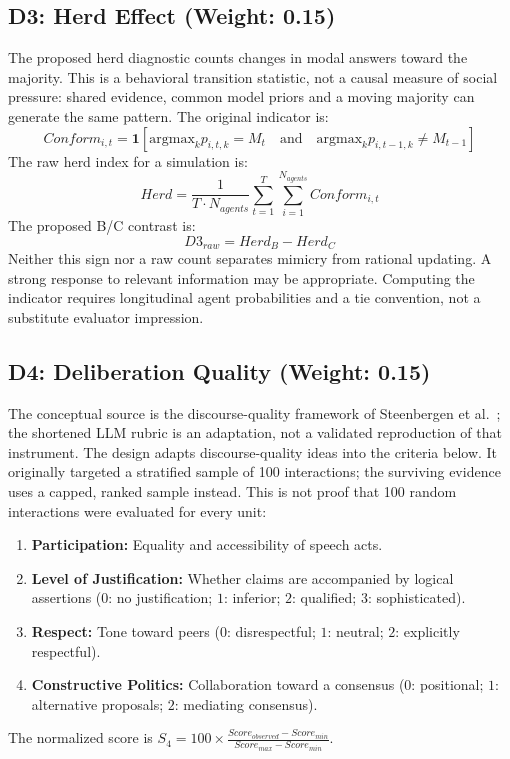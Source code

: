 \subsection{D3: Herd Effect (Weight: 0.15)}
The proposed herd diagnostic counts changes in modal answers toward the majority. This is a behavioral transition statistic, not a causal measure of social pressure: shared evidence, common model priors and a moving majority can generate the same pattern. The original indicator is:
\begin{equation}
    Conform_{i,t} = \mathbf{1}\left[\text{argmax}_k p_{i,t,k} = M_t \quad \text{and} \quad \text{argmax}_k p_{i,t-1,k} \neq M_{t-1}\right]
\end{equation}
The raw herd index for a simulation is:
\begin{equation}
    Herd = \frac{1}{T \cdot N_{agents}} \sum_{t=1}^T \sum_{i=1}^{N_{agents}} Conform_{i,t}
\end{equation}
The proposed B/C contrast is:
\begin{equation}
    D3_{raw} = Herd_B - Herd_C
\end{equation}
Neither this sign nor a raw count separates mimicry from rational updating. A strong response to relevant information may be appropriate. Computing the indicator requires longitudinal agent probabilities and a tie convention, not a substitute evaluator impression.

\subsection{D4: Deliberation Quality (Weight: 0.15)}
The conceptual source is the discourse-quality framework of Steenbergen et al.~\cite{steenbergen2003}; the shortened LLM rubric is an adaptation, not a validated reproduction of that instrument.
The design adapts discourse-quality ideas into the criteria below. It originally targeted a stratified sample of 100 interactions; the surviving evidence uses a capped, ranked sample instead. This is not proof that 100 random interactions were evaluated for every unit:
\begin{enumerate}
    \item \textbf{Participation:} Equality and accessibility of speech acts.
    \item \textbf{Level of Justification:} Whether claims are accompanied by logical assertions ($0$: no justification; $1$: inferior; $2$: qualified; $3$: sophisticated).
    \item \textbf{Respect:} Tone toward peers ($0$: disrespectful; $1$: neutral; $2$: explicitly respectful).
    \item \textbf{Constructive Politics:} Collaboration toward a consensus ($0$: positional; $1$: alternative proposals; $2$: mediating consensus).
\end{enumerate}
The normalized score is $S_4 = 100 \times \frac{Score_{observed} - Score_{min}}{Score_{max} - Score_{min}}$.

